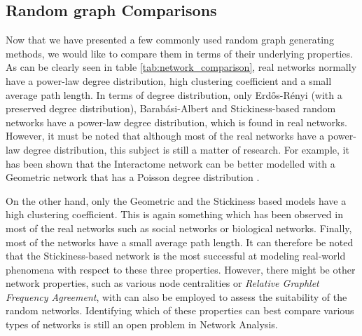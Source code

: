 \subsection{Random graph Comparisons}

Now that we have presented a few commonly used random graph generating methods, we would like to compare them in terms of their underlying properties. As can be clearly seen in table \ref{tab:network_comparison}, real networks
normally have a power-law degree distribution, high clustering coefficient and
a small average path length. In terms of degree distribution, only Erd\H{o}s-R\'{e}nyi
(with a preserved degree distribution), Barab\'{a}si-Albert and Stickiness-based
random networks have a power-law degree distribution, which is found in real
networks. However, it must be noted that although most of the real networks
have a power-law degree distribution, this subject is still a matter of research. For
example, it has been shown that the Interactome network can be better modelled with
a Geometric network that has a Poisson degree distribution \cite{prvzulj2004modeling}.

On the other hand, only the Geometric and the Stickiness based models have a
high clustering coefficient. This is again something which has been observed in
most of the real networks such as social networks or biological networks.
Finally, most of the networks have a small average path length. It can
therefore be noted that the Stickiness-based network is the most successful
at modeling real-world phenomena with respect to these three properties.
However, there might be other network properties, such as various node
centralities \cite{newman2009networks} or \emph{Relative Graphlet Frequency
Agreement}, with can also be employed to
assess the suitability of the random networks. Identifying which of these 
properties can best compare various types of networks is still an open problem in
Network Analysis.




